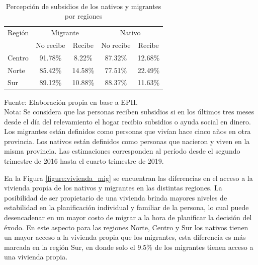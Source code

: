 \documentclass[12pt,a4paper]{article}
\begin{document}
\begin{table}[htbp!]
\caption{\\Percepción de subsidios de los nativos y migrantes por regiones} 
\label{cuadro:subsidio_mig}
\centering
\begin{tabular}{lcccc}
\hline
\multicolumn{1}{c}{Región} & \multicolumn{2}{c}{Migrante} & \multicolumn{2}{c}{Nativo} \\ \cline{2-5} 
                           & No recibe      & Recibe      & No recibe     & Recibe     \\ \hline
Centro                     & 91.78\%        & 8.22\%      & 87.32\%       & 12.68\%    \\ 
Norte                      & 85.42\%        & 14.58\%     & 77.51\%       & 22.49\%    \\ 
Sur                        & 89.12\%        & 10.88\%     & 88.37\%       & 11.63\%    \\ \hline
\end{tabular}
\begin{flushleft}
\begin{scriptsize}
Fuente: Elaboración propia en base a EPH.\\
Nota: Se considera que las personas reciben subsidios si en los últimos tres meses desde el día del relevamiento el hogar recibio subsidios o ayuda social en dinero. Los migrantes están definidos como personas que vivían hace cinco años en otra provincia. Los nativos están definidos como personas que nacieron y viven en la misma provincia. Las estimaciones corresponden al período desde el segundo trimestre de 2016 hasta el cuarto trimestre de 2019.
\end{scriptsize}
\end{flushleft}
\end{table}

En la Figura \ref{figure:vivienda_mig} se encuentran las diferencias en el acceso a la vivienda propia de los nativos y migrantes  en las distintas regiones. La posibilidad de ser propietario de una vivienda brinda mayores niveles de estabilidad en la planificación individual y familiar de la persona, lo cual puede desencadenar en un mayor costo de migrar a la hora de planificar la decisión del éxodo. En este aspecto para las regiones Norte, Centro y Sur los nativos tienen un mayor acceso a la vivienda propia que los migrantes, esta diferencia es más marcada en la región Sur, en donde solo el 9.5\% de los migrantes tienen acceso a una vivienda propia.
\end{document}

